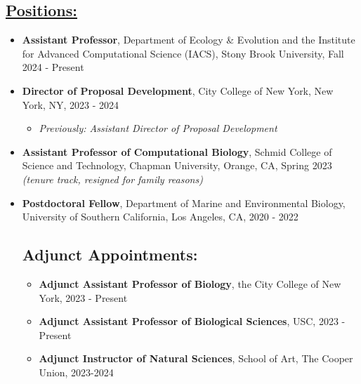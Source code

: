 \documentclass[]{res}
\begin{document}
 
 \small
{} %
 
 

\address{{\bf pronouns:} they/them/theirs {\emph{or}} she/her/hers\\ {\bf email:} jackie.weissman@stonybrook.edu}
\address{{\bf website:} https://microbialgamut.com/}%

 
\begin{resume} 
 

 \section{\underline{Positions:}} %
\begin{itemize}[leftmargin=*]
\setlength\itemsep{0.5em}
\item[] {\bf Assistant Professor}, Department of Ecology \& Evolution and the Institute for Advanced Computational Science (IACS), Stony Brook University, Fall 2024 - Present
\item[] {\bf Director of Proposal Development}, City College of New York, New York, NY, 2023 - 2024
\begin{itemize}[leftmargin=*]
\item \emph{Previously: Assistant Director of Proposal Development}
\end{itemize}
\item[] {\bf Assistant Professor of Computational Biology}, Schmid College of Science and Technology, Chapman University, Orange, CA, Spring 2023 \emph{(tenure track, resigned for family reasons)}
\item[] {\bf Postdoctoral Fellow}, Department of Marine and Environmental Biology, University of Southern California, Los Angeles, CA, 2020 - 2022

 \section{Adjunct Appointments:}
\begin{itemize}[leftmargin=*]
\setlength\itemsep{0.5em}
\item[] {\bf Adjunct Assistant Professor of Biology}, the City College of New York, 2023 - Present
\item[] {\bf Adjunct Assistant Professor of Biological Sciences}, USC, 2023 - Present
\item[] {\bf Adjunct Instructor of Natural Sciences}, School of Art, The Cooper Union, 2023-2024
\end{itemize}


\end{itemize}
\end{resume}
\end{document}
